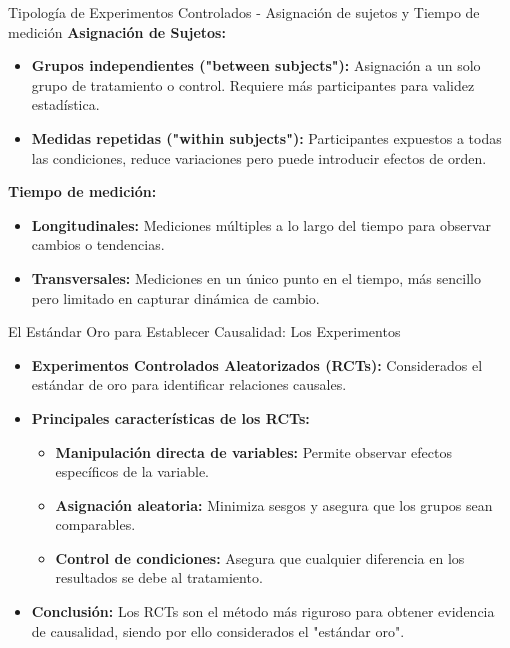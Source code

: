 ﻿\documentclass{beamer}
\begin{document}
\begin{frame}{Tipología de Experimentos Controlados - Asignación de sujetos y Tiempo de medición}
    \textbf{Asignación de Sujetos:}
    \begin{itemize}
        \item \textbf{Grupos independientes ("between subjects"):} Asignación a un solo grupo de tratamiento o control. Requiere más participantes para validez estadística.
        \item \textbf{Medidas repetidas ("within subjects"):} Participantes expuestos a todas las condiciones, reduce variaciones pero puede introducir efectos de orden.
    \end{itemize}

    \textbf{Tiempo de medición:}
    \begin{itemize}
        \item \textbf{Longitudinales:} Mediciones múltiples a lo largo del tiempo para observar cambios o tendencias.
        \item \textbf{Transversales:} Mediciones en un único punto en el tiempo, más sencillo pero limitado en capturar dinámica de cambio.
    \end{itemize}
\end{frame}


\begin{frame}{El Estándar Oro para Establecer Causalidad: Los Experimentos}
    \begin{itemize}
        \item \textbf{Experimentos Controlados Aleatorizados (RCTs):} Considerados el estándar de oro para identificar relaciones causales.
        \item \textbf{Principales características de los RCTs:}
            \begin{itemize}
                \item \textbf{Manipulación directa de variables:} Permite observar efectos específicos de la variable.
                \item \textbf{Asignación aleatoria:} Minimiza sesgos y asegura que los grupos sean comparables.
                \item \textbf{Control de condiciones:} Asegura que cualquier diferencia en los resultados se debe al tratamiento.
            \end{itemize}
        \item \textbf{Conclusión:} Los RCTs son el método más riguroso para obtener evidencia de causalidad, siendo por ello considerados el "estándar oro".
    \end{itemize}
\end{frame}
\end{document}

